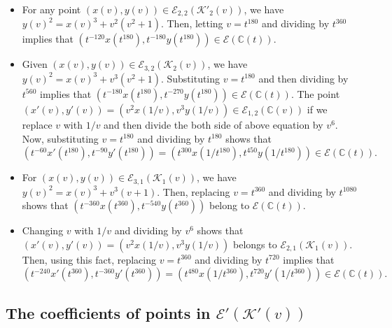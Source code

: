 \documentclass[11pt]{amsart}
\newcommand{\CC}{{\mathbb C}}
\newcommand{\Ee}{{\mathcal E}}
\newcommand{\KK}{{\mathcal K}}
\numberwithin{equation}{section}
\numberwithin{table}{section}
\newcommand\<{\langle}
\begin{document}
\begin{itemize}
	
	
	\item[(7)] For any point $(x(v), y(v)) \in \Ee_{2, 2} (\KK'_2(v))$, we have 
	$ y(v)^2=x(v)^3+  v^2 (v^2+1)$.  Then,  letting $v=t^{180}$ and dividing  by $t^{360}$ implies that 
	$\left( t^{-120}  x(t^{180}),t^{-180}  y(t^{180})\right)  \in \Ee (\CC(t)).$
	
	
	\item[(8)] Given $(x(v), y(v)) \in \Ee_{3, 2} (\KK_2(v))$, we have  
	$ y(v)^2=x(v)^3+  v^3 (v^2+1)$. Substituting $v=t^{180}$ and 
	then dividing by $t^{560}$ implies that
	$\left( t^{-180} x(t^{180}), t^{-270} y(t^{180}) \right) \in \Ee (\CC(t))$.
	The point  $ (x'(v), y'(v))=(v^2 x(1/v), v^3 y(1/v)) \in \Ee_{1, 2} (\CC(v))$ if we replace $v$ with $1/v$ and then divide the both side of above equation by $v^6$.
	Now,  substituting $v=t^{180}$ and  dividing by $t^{180}$ shows that
	$ \left( t^{-60} x'(t^{180}) , t^{-90} y'(t^{180})\right) =
	\left(  t^{300}  x(1/t^{180}),t^{450}  y(1/t^{180}) \right)\in \Ee (\CC(t)).$
	
	
	\item[(9)]  For $(x(v), y(v)) \in \Ee_{3, 1} (\KK_1(v))$,  we have 
	$ y(v)^2=x(v)^3+  v^3 (v+1)$. Then, replacing $v=t^{360}$ and dividing by $t^{1080}$ shows that $\left(t^{-360} x(t^{360}) , t^{-540} y(t^{360}) \right)$
	belong to $\Ee (\CC(t))$. 
	
	\item[(10)]
	Changing $v$ with $1/v$ and dividing by $v^6$ shows that
	$ (x'(v), y'(v))=(v^2 x(1/v), v^3 y(1/v))$ belongs to $ \Ee_{2, 1} (\KK_1(v))$.
	Then, using this fact,  replacing $v=t^{360}$ and dividing by $t^{720}$ 
	implies that
	$	\left( t^{-240} x'(t^{360}), t^{-360} y'(t^{360}) \right)=
	\left( t^{480} x(1/t^{360}), t^{720 } y'(1/t^{360}) \right) \in \Ee (\CC(t)).$
\end{itemize}

\fi

\iffalse

\subsection{The coefficients of points in $\Ee'(\KK'(v))$}
\label{K3C}
\end{document}
